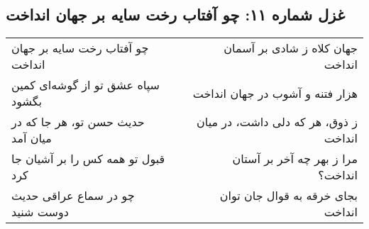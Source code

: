 \begin{center}
\section*{غزل شماره ۱۱: چو آفتاب رخت سایه بر جهان انداخت}
\label{sec:011}
\begin{longtable}{l p{0.5cm} r}
چو آفتاب رخت سایه بر جهان انداخت
&&
جهان کلاه ز شادی بر آسمان انداخت
\\
سپاه عشق تو از گوشه‌ای کمین بگشود
&&
هزار فتنه و آشوب در جهان انداخت
\\
حدیث حسن تو، هر جا که در میان آمد
&&
ز ذوق، هر که دلی داشت، در میان انداخت
\\
قبول تو همه کس را بر آشیان جا کرد
&&
مرا ز بهر چه آخر بر آستان انداخت؟
\\
چو در سماع عراقی حدیث دوست شنید
&&
بجای خرقه به قوال جان توان انداخت
\\
\end{longtable}
\end{center}
